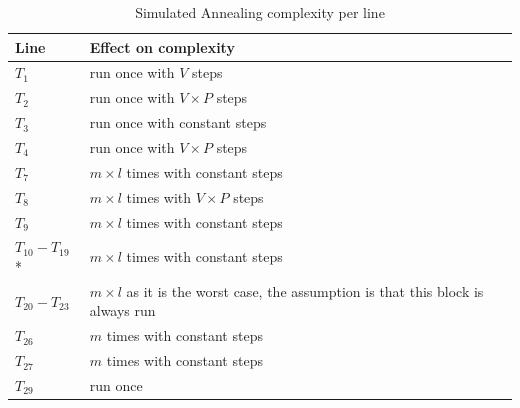 \documentclass[12pt]{report}
\begin{document}
\begin{table}[H]
\centering
\caption{Simulated Annealing complexity per line}
\label{simLines}
\begin{tabular}{@{}|l|l|@{}}
\toprule
Line              & Effect on complexity                                                                                                        \\ \midrule
$T_1$             & run once with $V$ steps                                                                                                     \\ \midrule
$T_2$             & run once with $V \times P$ steps                                                                                            \\ \midrule
$T_3$             & run once with constant steps                                                                                                \\ \midrule
$T_4$             & run once with $V \times P$ steps                                                                                            \\ \midrule
$T_7$             & $m \times l$ times with constant steps                                                                                      \\ \midrule
$T_8$             & $m \times l$ times with $V \times P$ steps                                                                                  \\ \midrule
$T_9$             & $m \times l$ times with constant steps                                                                                      \\ \midrule
$T_{10} - T_{19}$* & $m \times l$ times with constant steps \\ \midrule
$T_{20} - T_{23}$ & $m \times l$ as it is the worst case, the assumption is that this block is always run                                       \\ \midrule
$T_{26}$          & $m$ times with constant steps                                                                                               \\ \midrule
$T_{27}$          & $m$ times with constant steps                                                                                               \\ \midrule
$T_{29}$          & run once                                                                                                                    \\ \bottomrule
\end{tabular}
\end{table}
\end{document}
